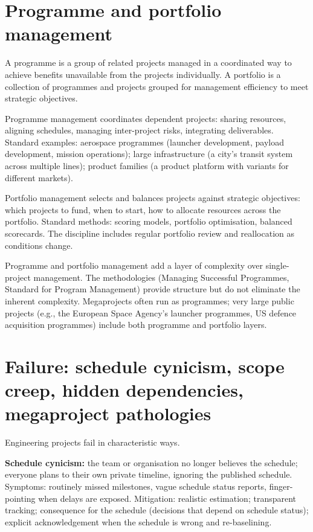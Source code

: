 \section{Programme and portfolio management}

A programme is a group of related projects managed in a coordinated way to achieve benefits unavailable from the projects individually. A portfolio is a collection of programmes and projects grouped for management efficiency to meet strategic objectives.

Programme management coordinates dependent projects: sharing resources, aligning schedules, managing inter-project risks, integrating deliverables. Standard examples: aerospace programmes (launcher development, payload development, mission operations); large infrastructure (a city's transit system across multiple lines); product families (a product platform with variants for different markets).

Portfolio management selects and balances projects against strategic objectives: which projects to fund, when to start, how to allocate resources across the portfolio. Standard methods: scoring models, portfolio optimisation, balanced scorecards. The discipline includes regular portfolio review and reallocation as conditions change.

Programme and portfolio management add a layer of complexity over single-project management. The methodologies (Managing Successful Programmes, Standard for Program Management) provide structure but do not eliminate the inherent complexity. Megaprojects often run as programmes; very large public projects (e.g., the European Space Agency's launcher programmes, US defence acquisition programmes) include both programme and portfolio layers.

\section{Failure: schedule cynicism, scope creep, hidden dependencies, megaproject pathologies}

Engineering projects fail in characteristic ways.

\textbf{Schedule cynicism:} the team or organisation no longer believes the schedule; everyone plans to their own private timeline, ignoring the published schedule. Symptoms: routinely missed milestones, vague schedule status reports, finger-pointing when delays are exposed. Mitigation: realistic estimation; transparent tracking; consequence for the schedule (decisions that depend on schedule status); explicit acknowledgement when the schedule is wrong and re-baselining.

